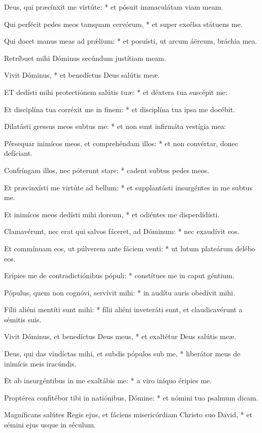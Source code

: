 Deus, qui præcínxit me virtúte: * et pósuit immaculátam viam meam.

Qui perfécit pedes meos tamquam cervórum, * et super excélsa státuens me.

Qui docet manus meas ad prǽlium: * et posuísti, ut arcum áëreum, bráchia mea.

 Retríbuet mihi Dóminus secúndum justítiam meam.

 Vivit Dóminus, * et benedíctus Deus salútis meæ.


\lettrine[lines=2]{E}{T} dedísti mihi protectiónem salútis tuæ: * et déxtera tua suscépit me:

Et disciplína tua corréxit me in finem: * et disciplína tua ipsa me docébit.

Dilatásti gressus meos subtus me: * et non sunt infirmáta vestígia mea:

Pérsequar inimícos meos, et comprehéndam illos: * et non convértar, donec defíciant.

Confríngam illos, nec póterunt stare: * cadent subtus pedes meos.

Et præcinxísti me virtúte ad bellum: * et supplantásti insurgéntes in me subtus me.

Et inimícos meos dedísti mihi dorsum, * et odiéntes me disperdidísti.

Clamavérunt, nec erat qui salvos fáceret, ad Dóminum: * nec exaudívit eos.

Et commínuam eos, ut púlverem ante fáciem venti: * ut lutum plateárum delébo eos.

Erípies me de contradictiónibus pópuli: * constítues me in caput géntium.

Pópulus, quem non cognóvi, servívit mihi: * in audítu auris obedívit mihi.

Fílii aliéni mentíti sunt mihi: * fílii aliéni inveteráti sunt, et claudicavérunt a sémitis suis.

Vivit Dóminus, et benedíctus Deus meus, * et exaltétur Deus salútis meæ.

Deus, qui das vindíctas mihi, et subdis pópulos sub me, * liberátor meus de inimícis meis iracúndis.

Et ab insurgéntibus in me exaltábis me: * a viro iníquo éripies me.

Proptérea confitébor tibi in natiónibus, Dómine: * et nómini tuo psalmum dicam.

Magníficans salútes Regis ejus, et fáciens misericórdiam Christo suo David, * et sémini ejus usque in séculum.

